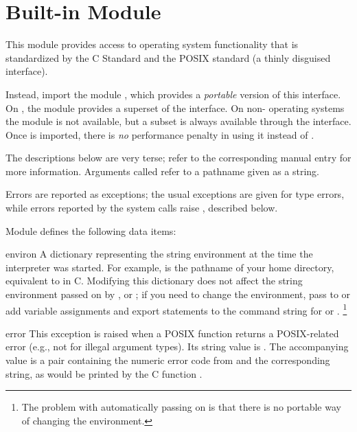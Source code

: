 \section{Built-in Module }

This module provides access to operating system functionality that is
standardized by the C Standard and the POSIX standard (a thinly disguised
\UNIX{} interface).

  Instead, import the
module , which provides a \emph{portable} version of this
interface.  On \UNIX{}, the  module provides a superset of
the  interface.  On non-\UNIX{} operating systems the
 module is not available, but a subset is always available
through the  interface.  Once  is imported, there is
\emph{no} performance penalty in using it instead of
.

The descriptions below are very terse; refer to the
corresponding \UNIX{} manual entry for more information.  Arguments
called  refer to a pathname given as a string.

Errors are reported as exceptions; the usual exceptions are given
for type errors, while errors reported by the system calls raise
, described below.

Module  defines the following data items:

\renewcommand{\indexsubitem}{(data in module posix)}
\begin{datadesc}{environ}
A dictionary representing the string environment at the time
the interpreter was started.
For example,
is the pathname of your home directory, equivalent to
in C.
Modifying this dictionary does not affect the string environment
passed on by ,  or ; if you
need to change the environment, pass  to 
or add variable assignments and export statements to the command
string for  or .%
\footnote{The problem with automatically passing on  is
that there is no portable way of changing the environment.}
\end{datadesc}

\renewcommand{\indexsubitem}{(exception in module posix)}
\begin{excdesc}{error}
This exception is raised when a POSIX function returns a
POSIX-related error (e.g., not for illegal argument types).  Its
string value is .  The accompanying value is a
pair containing the numeric error code from  and the
corresponding string, as would be printed by the C function
.
\end{excdesc}

